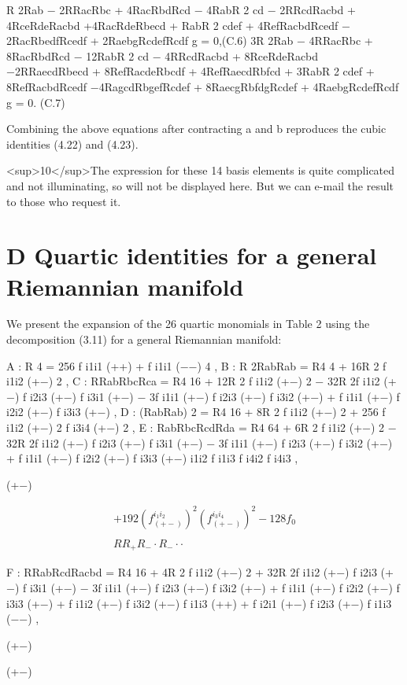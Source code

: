\documentclass{article}
\begin{document}
R 2Rab − 2RRacRbc + 4RacRbdRcd − 4RabR 2 cd − 2RRcdRacbd + 4RceRdeRacbd +4RacRdeRbecd + RabR 2 cdef + 4RefRacbdRcedf − 2RacRbedfRcedf + 2RaebgRcdefRcdf g = 0,(C.6) 3R 2Rab − 4RRacRbc + 8RacRbdRcd − 12RabR 2 cd − 4RRcdRacbd + 8RceRdeRacbd −2RRaecdRbecd + 8RefRacdeRbcdf + 4RefRaecdRbfcd + 3RabR 2 cdef + 8RefRacbdRcedf −4RagcdRbgefRcdef + 8RaecgRbfdgRcdef + 4RaebgRcdefRcdf g = 0. (C.7)

Combining the above equations after contracting a and b reproduces the cubic identities (4.22) and (4.23).

<sup>10</sup>The expression for these 14 basis elements is quite complicated and not illuminating, so will not be displayed here. But we can e-mail the result to those who request it.

\section{D Quartic identities for a general Riemannian manifold}

We present the expansion of the 26 quartic monomials in Table 2 using the decomposition (3.11) for a general Riemannian manifold:

A : R 4 = 256 f i1i1 (++) + f i1i1 (−−) 4 , B : R 2RabRab = R4 4 + 16R 2 f i1i2 (+−) 2 , C : RRabRbcRca = R4 16 + 12R 2 f i1i2 (+−) 2 − 32R 2f i1i2 (+−) f i2i3 (+−) f i3i1 (+−) − 3f i1i1 (+−) f i2i3 (+−) f i3i2 (+−) + f i1i1 (+−) f i2i2 (+−) f i3i3 (+−) , D : (RabRab) 2 = R4 16 + 8R 2 f i1i2 (+−) 2 + 256 f i1i2 (+−) 2 f i3i4 (+−) 2 , E : RabRbcRcdRda = R4 64 + 6R 2 f i1i2 (+−) 2 − 32R 2f i1i2 (+−) f i2i3 (+−) f i3i1 (+−) − 3f i1i1 (+−) f i2i3 (+−) f i3i2 (+−) + f i1i1 (+−) f i2i2 (+−) f i3i3 (+−) i1i2 f i1i3 f i4i2 f i4i3 ,

(+−)

$$\begin{array}{c}{{+192\left(f_{(+-)}^{i_{1}i_{2}}\right)^{2}\left(f_{(+-)}^{i_{3}i_{4}}\right)^{2}-128f_{0}}}\\ {{}}\\ {{R R_{+}R_{-}\cdot R_{-}\cdot\cdot}}\end{array}$$

F : RRabRcdRacbd = R4 16 + 4R 2 f i1i2 (+−) 2 + 32R 2f i1i2 (+−) f i2i3 (+−) f i3i1 (+−) − 3f i1i1 (+−) f i2i3 (+−) f i3i2 (+−) + f i1i1 (+−) f i2i2 (+−) f i3i3 (+−) + f i1i2 (+−) f i3i2 (+−) f i1i3 (++) + f i2i1 (+−) f i2i3 (+−) f i1i3 (−−) ,

(+−)

(+−)
\end{document}
